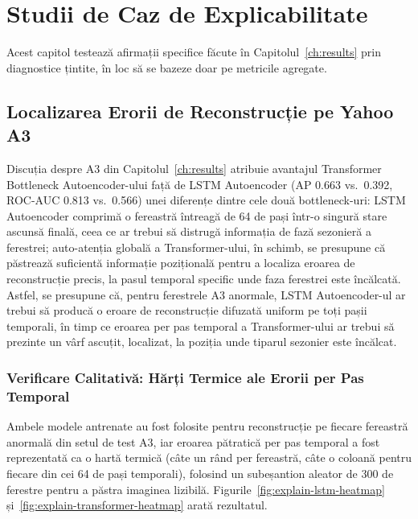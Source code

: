 \chapter{Studii de Caz de Explicabilitate}
\label{ch:explainability}

Acest capitol testează afirmații specifice făcute în Capitolul~\ref{ch:results} prin diagnostice țintite, în loc să se bazeze doar pe metricile agregate.

\section{Localizarea Erorii de Reconstrucție pe Yahoo A3}
\label{sec:explain-yahoo}

Discuția despre A3 din Capitolul~\ref{ch:results} atribuie avantajul Transformer Bottleneck Autoencoder-ului față de LSTM Autoencoder (AP 0.663 vs.\ 0.392, ROC-AUC 0.813 vs.\ 0.566) unei diferențe dintre cele două bottleneck-uri: LSTM Autoencoder comprimă o fereastră întreagă de 64 de pași într-o singură stare ascunsă finală, ceea ce ar trebui să distrugă informația de fază sezonieră a ferestrei;
auto-atenția globală a Transformer-ului, în schimb, se presupune că păstrează suficientă informație pozițională pentru a localiza eroarea de reconstrucție precis, la pasul temporal specific unde faza ferestrei este încălcată.
Astfel, se presupune că, pentru ferestrele A3 anormale, LSTM Autoencoder-ul ar trebui să producă o eroare de reconstrucție difuzată uniform pe toți pașii temporali, în timp ce eroarea per pas temporal a Transformer-ului ar trebui să prezinte un vârf ascuțit, localizat, la poziția unde tiparul sezonier este încălcat.

\subsection{Verificare Calitativă: Hărți Termice ale Erorii per Pas Temporal}

Ambele modele antrenate au fost folosite pentru reconstrucție pe fiecare fereastră anormală din setul de test A3, iar eroarea pătratică per pas temporal a fost reprezentată ca o hartă termică (câte un rând per fereastră, câte o coloană pentru fiecare din cei 64 de pași temporali), folosind un subeșantion aleator de 300 de ferestre pentru a păstra imaginea lizibilă.
Figurile~\ref{fig:explain-lstm-heatmap} și~\ref{fig:explain-transformer-heatmap} arată rezultatul.

